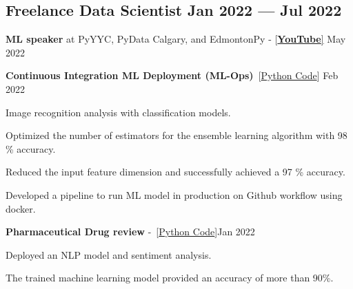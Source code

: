 \documentclass[letter,11pt]{article}
\begin{document}
\subsection{Freelance Data Scientist \hfill Jan 2022 --- Jul 2022}
\begin{zitemize}
	\item \textbf{ML speaker} at PyYYC, PyData Calgary, and EdmontonPy - [\href{https://www.youtube.com/watch?v=4S_QGDHTICw}{\textbf{YouTube}]} \hfill May 2022
	\item \textbf{Continuous Integration ML Deployment (ML-Ops)}~[\href{https://github.com/Hadi2525/ML_production_01/tree/Hadi2525-patch-1}{Python Code}] \hfill Feb 2022
	\begin{zitemize}
		\item Image recognition analysis with classification models.
		\item Optimized the number of estimators for the ensemble learning algorithm with 98 \% accuracy.
		\item Reduced the input feature dimension and successfully achieved a 97 \% accuracy.
		\item Developed a pipeline to run ML model in production on Github workflow using docker.
	\end{zitemize}
	\item \textbf{Pharmaceutical Drug review} -~[\href{https://github.com/Hadi2525/applied_ML/blob/master/Pharma/drug_model.ipynb}{Python Code}]\hfill Jan 2022
	\begin{zitemize}
		\item Deployed an NLP model and sentiment analysis.
		\item The trained machine learning model provided an accuracy of more than 90\%.
	\end{zitemize}

\end{zitemize}
\end{document}
